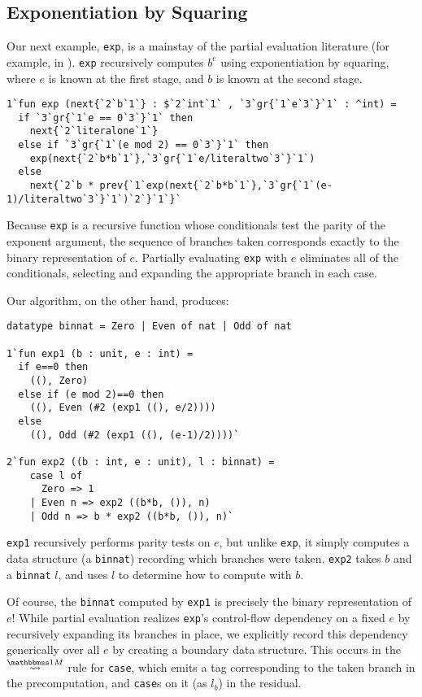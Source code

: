 \subsection{Exponentiation by Squaring}

Our next example, \texttt{exp}, is a mainstay of the partial evaluation
literature (for example, in \cite{jones96}). \texttt{exp} recursively computes
$b^e$ using exponentiation by squaring, where $e$ is known at the first stage,
and $b$ is known at the second stage. 
%
\begin{lstlisting} 
1`fun exp (next{`2`b`1`} : $`2`int`1` , `3`gr{`1`e`3`}`1` : ^int) = 
  if `3`gr{`1`e == 0`3`}`1` then 
    next{`2`literalone`1`}
  else if `3`gr{`1`(e mod 2) == 0`3`}`1` then
    exp(next{`2`b*b`1`},`3`gr{`1`e/literaltwo`3`}`1`)
  else 
    next{`2`b * prev{`1`exp(next{`2`b*b`1`},`3`gr{`1`(e-1)/literaltwo`3`}`1`)`2`}`1`}`
\end{lstlisting}
%
Because \texttt{exp} is a recursive function whose conditionals test the parity
of the exponent argument, the sequence of branches taken corresponds exactly to
the binary representation of $e$. Partially evaluating \texttt{exp} with $e$
eliminates all of the conditionals, selecting and expanding the appropriate
branch in each case.

Our algorithm, on the other hand, produces:
%
\begin{lstlisting} 
datatype binnat = Zero | Even of nat | Odd of nat

1`fun exp1 (b : unit, e : int) =
  if e==0 then
    ((), Zero)
  else if (e mod 2)==0 then 
    ((), Even (#2 (exp1 ((), e/2))))
  else 
    ((), Odd (#2 (exp1 ((), (e-1)/2))))`

2`fun exp2 ((b : int, e : unit), l : binnat) =
    case l of
      Zero => 1
    | Even n => exp2 ((b*b, ()), n)
    | Odd n => b * exp2 ((b*b, ()), n)`
\end{lstlisting}
%
\texttt{exp1} recursively performs parity tests on $e$, but unlike \texttt{exp},
it simply computes a data structure (a \texttt{binnat}) recording which branches
were taken. \texttt{exp2} takes $b$ and a \texttt{binnat} $l$, and uses $l$ to
determine how to compute with $b$.

Of course, the \texttt{binnat} computed by \texttt{exp1} is precisely the binary
representation of $e$! While partial evaluation realizes \texttt{exp}'s
control-flow dependency on a fixed $e$ by recursively expanding its branches in
place, we explicitly record this dependency generically over all $e$ by creating
a boundary data structure. This occurs in the $\splitonesym$ rule for
\texttt{case}, which emits a tag corresponding to the taken branch in the
precomputation, and \texttt{case}s on it (as $l_b$) in the residual.

